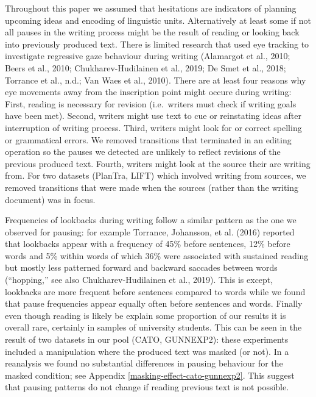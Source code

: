 \documentclass[
  man,floatsintext]{apa7}
\begin{document}
Throughout this paper we assumed that hesitations are indicators of planning upcoming ideas and encoding of linguistic units. Alternatively at least some if not all pauses in the writing process might be the result of reading or looking back into previously produced text. There is limited research that used eye tracking to investigate regressive gaze behaviour during writing (Alamargot et al., 2010; Beers et al., 2010; Chukharev-Hudilainen et al., 2019; De Smet et al., 2018; Torrance et al., n.d.; Van Waes et al., 2010). There are at least four reasons why eye movements away from the inscription point might occure during writing: First, reading is necessary for revision (i.e.~writers must check if writing goals have been met). Second, writers might use text to cue or reinstating ideas after interruption of writing process. Third, writers might look for or correct spelling or grammatical errors. We removed transitions that terminated in an editing operation so the pauses we detected are unlikely to reflect revisions of the previous produced text. Fourth, writers might look at the source their are writing from. For two datasets (PlanTra, LIFT) which involved writing from sources, we removed transitions that were made when the sources (rather than the writing document) was in focus.

Frequencies of lookbacks during writing follow a similar pattern as the one we observed for pausing: for example Torrance, Johansson, et al. (2016) reported that lookbacks appear with a frequency of 45\% before sentences, 12\% before words and 5\% within words of which 36\% were associated with sustained reading but mostly less patterned forward and backward saccades between words (\enquote{hopping,} see also Chukharev-Hudilainen et al., 2019). This is except, lookbacks are more frequent before sentences compared to words while we found that pause frequencies appear equally often before sentences and words. Finally even though reading is likely be explain some proportion of our results it is overall rare, certainly in samples of university students. This can be seen in the result of two datasets in our pool (CATO, GUNNEXP2): these experiments included a manipulation where the produced text was masked (or not). In a reanalysis we found no substantial differences in pausing behaviour for the masked condition; see Appendix \ref{masking-effect-cato-gunnexp2}. This suggest that pausing patterns do not change if reading previous text is not possible.
\end{document}
